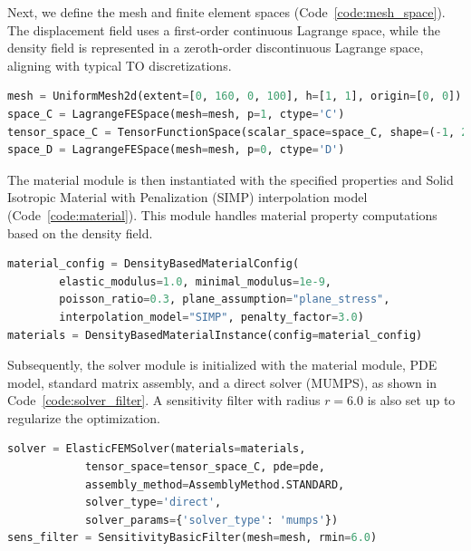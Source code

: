 \documentclass[mathpazo]{cicp}
\begin{document}
Next, we define the mesh and finite element spaces (Code~\ref{code:mesh_space}). The displacement field uses a first-order continuous Lagrange space, while the density field is represented in a zeroth-order discontinuous Lagrange space, aligning with typical TO discretizations.

\vspace{-0.5ex} %
\begin{lstlisting}[language=python, caption={Mesh and function space definitions}, label={code:mesh_space}]
mesh = UniformMesh2d(extent=[0, 160, 0, 100], h=[1, 1], origin=[0, 0])
space_C = LagrangeFESpace(mesh=mesh, p=1, ctype='C')
tensor_space_C = TensorFunctionSpace(scalar_space=space_C, shape=(-1, 2))
space_D = LagrangeFESpace(mesh=mesh, p=0, ctype='D')
\end{lstlisting}
\vspace{-0.5ex} %

The material module is then instantiated with the specified properties and Solid Isotropic Material with Penalization (SIMP) interpolation model (Code~\ref{code:material}). This module handles material property computations based on the density field.

\vspace{-0.5ex} %
\begin{lstlisting}[language=python, caption={Material module}, label={code:material}]
material_config = DensityBasedMaterialConfig(
		elastic_modulus=1.0, minimal_modulus=1e-9, 
		poisson_ratio=0.3, plane_assumption="plane_stress",  
		interpolation_model="SIMP", penalty_factor=3.0)
materials = DensityBasedMaterialInstance(config=material_config)
\end{lstlisting}
\vspace{-0.5ex} %

Subsequently, the solver module is initialized with the material module, PDE model, standard matrix assembly, and a direct solver (MUMPS), as shown in Code~\ref{code:solver_filter}. A sensitivity filter with radius $r = 6.0$ is also set up to regularize the optimization.

\vspace{-0.5ex} %
\begin{lstlisting}[language=python, caption={Solver and filter module}, label={code:solver_filter}] 
solver = ElasticFEMSolver(materials=materials,
			tensor_space=tensor_space_C, pde=pde,
			assembly_method=AssemblyMethod.STANDARD,
			solver_type='direct',
			solver_params={'solver_type': 'mumps'})
sens_filter = SensitivityBasicFilter(mesh=mesh, rmin=6.0)
\end{lstlisting}
\vspace{-0.5ex} %
\end{document}
